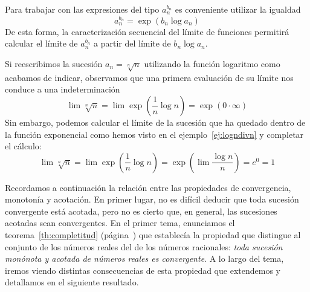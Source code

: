 Para trabajar con las expresiones del tipo $a_n^{b_n}$ es conveniente utilizar la igualdad
\[
a_n^{b_n}=\exp(b_n\log a_n)
\]
De esta forma, la caracterización secuencial del límite de funciones permitirá calcular el límite de $a_n^{b_n}$ a partir del límite de $b_n\log a_n$.
%
\begin{ejemplo}
Si reescribimos la sucesión $a_n=\sqrt[n]n$ utilizando la función logaritmo como acabamos de indicar, observamos que una primera evaluación de su límite nos conduce a una indeterminación
\[
\lim \sqrt[n]n = \lim \exp\left(\frac1n{\log n}\right) =\exp(0\cdot\infty)
\]
Sin embargo, podemos calcular el límite de la sucesión que ha quedado dentro de la función exponencial como hemos visto en el ejemplo~\ref{ej:logndivn} y completar el cálculo:
\[
\lim \sqrt[n]n = \lim \exp\left(\frac1n{\log n}\right) =\exp(\lim\frac{\log n}n)=e^0=1
\tag*{\fej}\]
\end{ejemplo}

%

Recordamos a continuación la relación entre las propiedades de convergencia, monotonía y acotación.
En primer lugar, no es difícil deducir que toda sucesión convergente está acotada, pero no es cierto que, en general, las sucesiones acotadas sean convergentes.
En el primer tema, enunciamos el teorema~\ref{th:completitud} (página~\pageref{th:completitud}) que establecía la propiedad que distingue al conjunto de los números reales del de los números racionales: \emph{toda sucesión monónota y acotada de números reales es convergente}.
A lo largo del tema, iremos viendo distintas consecuencias de esta propiedad que extendemos y detallamos en el siguiente resultado.

